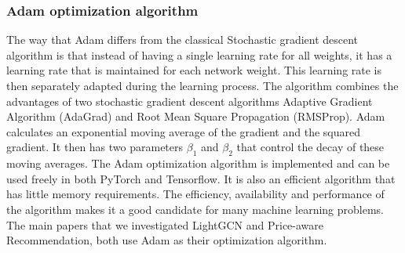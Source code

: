 \subsubsection{Adam optimization algorithm}\label{subsubsec:Adam}
The way that Adam differs from the classical Stochastic gradient descent algorithm is that instead of having a single learning rate for all weights, it has a learning rate that is maintained for each network weight\cite{Adam}.
This learning rate is then separately adapted during the learning process.
The algorithm combines the advantages of two stochastic gradient descent algorithms Adaptive Gradient Algorithm (AdaGrad) and Root Mean Square Propagation (RMSProp).
Adam calculates an exponential moving average of the gradient and the squared gradient.
It then has two parameters $\beta_1$ and $\beta_2$ that control the decay of these moving averages.
The Adam optimization algorithm is implemented and can be used freely in both PyTorch and Tensorflow.
It is also an efficient algorithm that has little memory requirements.
The efficiency, availability and performance of the algorithm makes it a good candidate for many machine learning problems.
The main papers that we investigated LightGCN \cite{lightgcn} and Price-aware Recommendation\cite{Priceaware}, both use Adam as their optimization algorithm.
